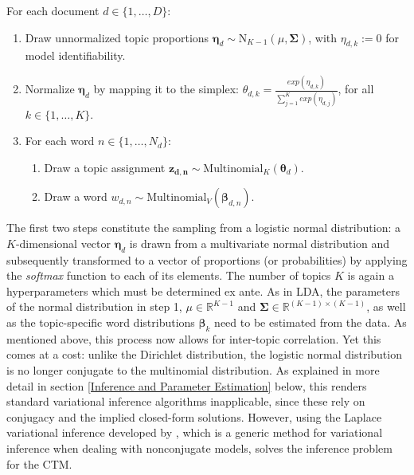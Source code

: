 \vspace{0.25cm}
\noindent
For each document $d \in \{1,\dots,D\}$:

\begin{enumerate}[{1)}]
\vspace{-0.25cm}
\item Draw unnormalized topic proportions $\boldsymbol{\eta}_d \sim \text{N}_{K-1}(\mu, \boldsymbol{\Sigma})$, with $\eta_{d,k} := 0$ for model identifiability.
\vspace{-0.25cm}
\item Normalize $\boldsymbol{\eta}_d$ by mapping it to the simplex: $\theta_{d,k} = \frac{exp(\eta_{d,k})}{\sum_{j=1}^{K}exp(\eta_{d,j})}$, for all $k \in \{1,\dots,K\}$.
\vspace{-0.25cm}
\item For each word $n \in \{1,\dots,N_d\}$:
	\begin{enumerate}[{a)}]
	\vspace{-0.25cm}    
    \item Draw a topic assignment $\boldsymbol{z_{d,n}} \sim \text{Multinomial}_K(\boldsymbol{\theta}_d)$.
	\vspace{-0.25cm}    
    \item Draw a word $w_{d,n} \sim \text{Multinomial}_V(\boldsymbol{\beta}_{d,n})$.
	\end{enumerate}
\end{enumerate}

\noindent
The first two steps constitute the sampling from a logistic normal distribution: a $K$-dimensional vector $\boldsymbol{\eta}_d$ is drawn from a multivariate normal distribution and subsequently transformed to a vector of proportions (or probabilities) by applying the \textit{softmax} function to each of its elements. The number of topics $K$ is again a hyperparameters which must be determined ex ante. As in LDA, the parameters of the normal distribution in step 1, $\mu \in \mathbb{R}^{K-1}$ and $\boldsymbol{\Sigma} \in \mathbb{R}^{(K-1) \times (K-1)}$, as well as the topic-specific word distributions $\boldsymbol{\beta}_k$ need to be estimated from the data. As mentioned above, this process now allows for inter-topic correlation. Yet this comes at a cost: unlike the Dirichlet distribution, the logistic normal distribution is no longer conjugate to the multinomial distribution. As explained in more detail in section \ref{Inference and Parameter Estimation} below, this renders standard variational inference algorithms inapplicable, since these rely on conjugacy and the implied closed-form solutions. However, using the Laplace variational inference developed by \cite{wang2013variational}, which is a generic method for variational inference when dealing with nonconjugate models, solves the inference problem for the CTM.

